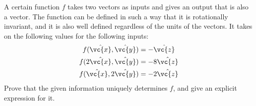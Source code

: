 A certain function $f$ takes two vectors as inputs and gives an output that is also a vector.
The function can be defined in such a way that it is rotationally invariant, and it is also
well defined regardless of the units of the vectors.
It takes on the following values for the following inputs:
\begin{align*}
f(\hat{\vc{x}},\hat{\vc{y}})&=-\hat{\vc{z}} \\
f(2\hat{\vc{x}},\hat{\vc{y}})&=-8\hat{\vc{z}} \\
f(\hat{\vc{x}},2\hat{\vc{y}})&=-2\hat{\vc{z}}
\end{align*}
Prove that the given information uniquely determines $f$, and give an explicit expression for it.

